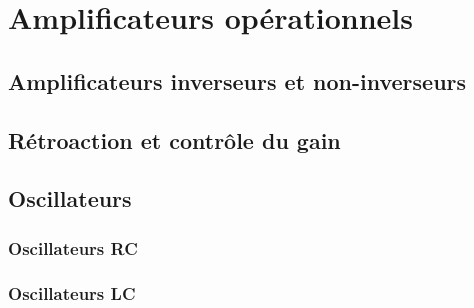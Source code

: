 \chapter{Amplificateurs opérationnels} \label{subsec:opamps}
\section{Amplificateurs inverseurs et non-inverseurs} \label{subsec:inverting_noninverting}
\section{Rétroaction et contrôle du gain} \label{subsec:feedback_gain}
\section{Oscillateurs} \label{subsec:oscillators}
\subsection{Oscillateurs RC} \label{subsec:rc_oscillators}
\subsection{Oscillateurs LC} \label{subsec:lc_oscillators}
